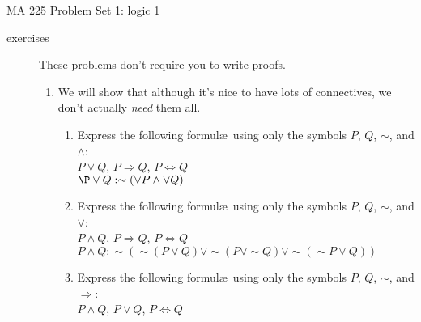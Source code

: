 \documentclass{letter}
\begin{document}
\pagestyle{empty}

{\Large MA 225 Problem Set 1: logic 1}\\
\begin{description}
\item[exercises] These problems don't require you to write proofs.
\begin{enumerate}
	\item We will show that although it's nice to have lots of connectives, we don't actually {\em need} them all.
			\begin{enumerate}\itemsep=1.25mm
				\item Express the following formul\ae\  using only the symbols $P$, $Q$, $\sim$, and $\wedge$: \\
				$P\vee Q$, $P\Rightarrow Q$, $P\Leftrightarrow Q$ \\
                               $\P \vee Q: \sim (\vee P \wedge \vee Q)$
				\item Express the following formul\ae\  using only the symbols $P$, $Q$, $\sim$, and $\vee$:\\
					$P\wedge Q$, $P\Rightarrow Q$, $P\Leftrightarrow Q$ \\
                                  $P \wedge Q: \sim ( \sim (P \vee Q) \vee \sim ( P \vee \sim Q) \vee \sim ( \sim P \vee Q))$
				\item Express the following formul\ae\ using only the symbols $P$, $Q$, $\sim$, and $\Rightarrow$:\\
				$P\wedge Q$, $P\vee Q$, $P\Leftrightarrow Q$ \\
                                

\end{enumerate}
\end{enumerate}
\end{description}
\end{document}
